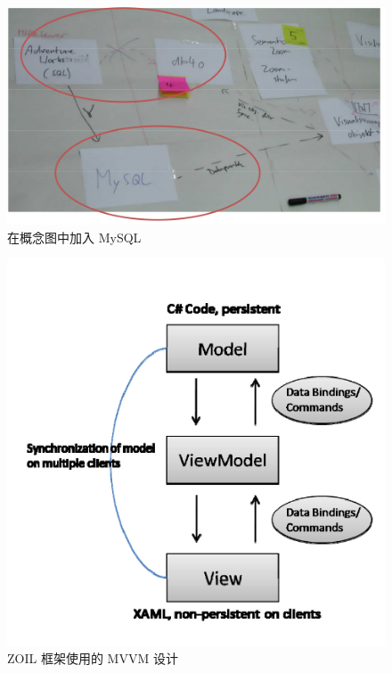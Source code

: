 \begin{figure}
  \begin{center}
    \includegraphics[scale=0.3]{figures/translation/translation_api_fig3.png}\\
    在概念图中加入 MySQL
  \end{center}
\end{figure}

\begin{figure}
  \begin{center}
    \includegraphics[scale=0.3]{figures/translation/translation_api_fig4.png}\\
    ZOIL 框架使用的 MVVM 设计
  \end{center}
\end{figure}

